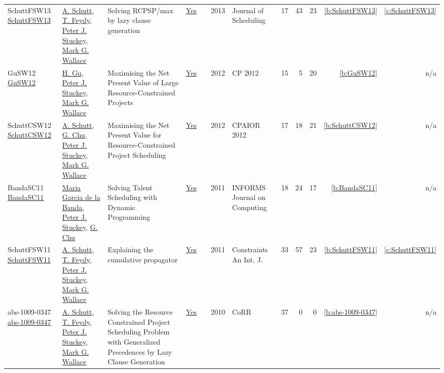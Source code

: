 {\begin{longtable}{>{\raggedright\arraybackslash}p{3cm}>{\raggedright\arraybackslash}p{6cm}>{\raggedright\arraybackslash}p{6.5cm}rrrp{2.5cm}rrrrr}
SchuttFSW13 \href{https://doi.org/10.1007/s10951-012-0285-x}{SchuttFSW13} & \hyperref[auth:a125]{A. Schutt}, \hyperref[auth:a155]{T. Feydy}, \hyperref[auth:a126]{Peter J. Stuckey}, \hyperref[auth:a117]{Mark G. Wallace} & Solving RCPSP/max by lazy clause generation & \href{../works/SchuttFSW13.pdf}{Yes} & \cite{SchuttFSW13} & 2013 & Journal of Scheduling & 17 & 43 & 23 & \ref{b:SchuttFSW13} & \ref{c:SchuttFSW13}\\
GuSW12 \href{https://doi.org/10.1007/978-3-642-33558-7_55}{GuSW12} & \hyperref[auth:a339]{H. Gu}, \hyperref[auth:a126]{Peter J. Stuckey}, \hyperref[auth:a117]{Mark G. Wallace} & Maximising the Net Present Value of Large Resource-Constrained Projects & \href{../works/GuSW12.pdf}{Yes} & \cite{GuSW12} & 2012 & CP 2012 & 15 & 5 & 20 & \ref{b:GuSW12} & n/a\\
SchuttCSW12 \href{https://doi.org/10.1007/978-3-642-29828-8_24}{SchuttCSW12} & \hyperref[auth:a125]{A. Schutt}, \hyperref[auth:a346]{G. Chu}, \hyperref[auth:a126]{Peter J. Stuckey}, \hyperref[auth:a117]{Mark G. Wallace} & Maximising the Net Present Value for Resource-Constrained Project Scheduling & \href{../works/SchuttCSW12.pdf}{Yes} & \cite{SchuttCSW12} & 2012 & CPAIOR 2012 & 17 & 18 & 21 & \ref{b:SchuttCSW12} & n/a\\
BandaSC11 \href{https://doi.org/10.1287/ijoc.1090.0378}{BandaSC11} & \hyperref[auth:a802]{Maria Garcia de la Banda}, \hyperref[auth:a126]{Peter J. Stuckey}, \hyperref[auth:a346]{G. Chu} & Solving Talent Scheduling with Dynamic Programming & \href{../works/BandaSC11.pdf}{Yes} & \cite{BandaSC11} & 2011 & INFORMS Journal on Computing & 18 & 24 & 17 & \ref{b:BandaSC11} & n/a\\
SchuttFSW11 \href{https://doi.org/10.1007/s10601-010-9103-2}{SchuttFSW11} & \hyperref[auth:a125]{A. Schutt}, \hyperref[auth:a155]{T. Feydy}, \hyperref[auth:a126]{Peter J. Stuckey}, \hyperref[auth:a117]{Mark G. Wallace} & Explaining the cumulative propagator & \href{../works/SchuttFSW11.pdf}{Yes} & \cite{SchuttFSW11} & 2011 & Constraints An Int. J. & 33 & 57 & 23 & \ref{b:SchuttFSW11} & \ref{c:SchuttFSW11}\\
abs-1009-0347 \href{http://arxiv.org/abs/1009.0347}{abs-1009-0347} & \hyperref[auth:a125]{A. Schutt}, \hyperref[auth:a155]{T. Feydy}, \hyperref[auth:a126]{Peter J. Stuckey}, \hyperref[auth:a117]{Mark G. Wallace} & Solving the Resource Constrained Project Scheduling Problem with Generalized Precedences by Lazy Clause Generation & \href{../works/abs-1009-0347.pdf}{Yes} & \cite{abs-1009-0347} & 2010 & CoRR & 37 & 0 & 0 & \ref{b:abs-1009-0347} & n/a\\

\end{longtable}}
